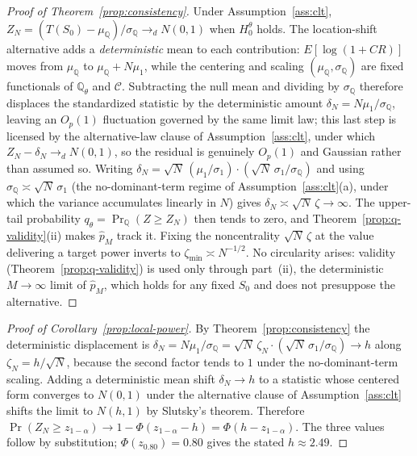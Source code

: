 \documentclass[preprint,12pt]{elsarticle}
\theoremstyle{definition}
\begin{document}
\begin{proof}[Proof of Theorem~\ref{prop:consistency}]
Under Assumption~\ref{ass:clt}, $Z_N=(T(S_0)-\mu_{\mathbb Q})/\sigma_{\mathbb
Q}\to_d N(0,1)$ when $H_0^\theta$ holds. The location-shift alternative adds a
\emph{deterministic} mean to each contribution: $E[\log(1+CR)]$ moves from
$\mu_{\mathbb Q}$ to $\mu_{\mathbb Q}+N\mu_1$, while the centering and scaling
$(\mu_{\mathbb Q},\sigma_{\mathbb Q})$ are fixed functionals of $\mathbb{Q}_\theta$
and $\mathcal C$. Subtracting the null mean and dividing by $\sigma_{\mathbb Q}$
therefore displaces the standardized statistic by the deterministic amount
$\delta_N=N\mu_1/\sigma_{\mathbb Q}$, leaving an $O_p(1)$ fluctuation governed by
the same limit law; this last step is licensed by the alternative-law clause of
Assumption~\ref{ass:clt}, under which $Z_N-\delta_N\to_d N(0,1)$, so the residual
is genuinely $O_p(1)$ and Gaussian rather than assumed so. Writing
$\delta_N=\sqrt N\,(\mu_1/\sigma_1)\cdot(\sqrt N\,\sigma_1/\sigma_{\mathbb Q})$ and
using $\sigma_{\mathbb Q}\asymp\sqrt N\,\sigma_1$ (the no-dominant-term regime of
Assumption~\ref{ass:clt}(a), under which the variance accumulates linearly in $N$)
gives $\delta_N\asymp\sqrt N\,\zeta\to\infty$. The upper-tail probability
$q_\theta=\Pr_{\mathbb Q}(Z\ge Z_N)$ then tends to zero, and
Theorem~\ref{prop:q-validity}(ii) makes $\hat p_M$ track it. Fixing the
noncentrality $\sqrt N\,\zeta$ at the value delivering a target power inverts to
$\zeta_{\min}\asymp N^{-1/2}$. No circularity arises: validity
(Theorem~\ref{prop:q-validity}) is used only through part~(ii), the deterministic
$M\to\infty$ limit of $\hat p_M$, which holds for any fixed $S_0$ and does not
presuppose the alternative.
\end{proof}

\begin{proof}[Proof of Corollary~\ref{prop:local-power}]
By Theorem~\ref{prop:consistency} the deterministic displacement is
$\delta_N=N\mu_1/\sigma_{\mathbb Q}=\sqrt N\,\zeta_N\cdot(\sqrt N\,\sigma_1/
\sigma_{\mathbb Q})\to h$ along $\zeta_N=h/\sqrt N$, because the second factor
tends to $1$ under the no-dominant-term scaling. Adding a deterministic mean shift
$\delta_N\to h$ to a statistic whose centered form converges to $N(0,1)$ under the
alternative clause of Assumption~\ref{ass:clt} shifts the limit to $N(h,1)$ by
Slutsky's theorem. Therefore
$\Pr(Z_N\ge z_{1-\alpha})\to1-\Phi(z_{1-\alpha}-h)=\Phi(h-z_{1-\alpha})$. The three
values follow by substitution; $\Phi(z_{0.80})=0.80$ gives the stated
$h\approx2.49$.
\end{proof}
\end{document}
